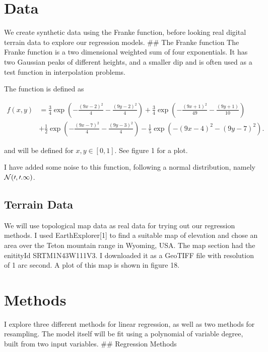 \documentclass[11pt]{article}
\begin{document}
    \hypertarget{data}{%
\section{Data}\label{data}}

We create synthetic data using the Franke function, before looking real
digital terrain data to explore our regression models. \#\# The Franke
function The Franke function is a two dimensional weighted sum of four
exponentials. It has two Gaussian peaks of different heights, and a
smaller dip and is often used as a test function in interpolation
problems.

The function is defined as

    \[
\begin{aligned*}
f(x,y) &= \frac{3}{4}\exp{\left(-\frac{(9x-2)^2}{4} - \frac{(9y-2)^2}{4}\right)}+\frac{3}{4}\exp{\left(-\frac{(9x+1)^2}{49}- \frac{(9y+1)}{10}\right)} \\
&+\frac{1}{2}\exp{\left(-\frac{(9x-7)^2}{4} - \frac{(9y-3)^2}{4}\right)} -\frac{1}{5}\exp{\left(-(9x-4)^2 - (9y-7)^2\right) }.
\end{aligned*}
\]

    and will be defined for \(x,y\in [0,1]\). See figure 1 for a plot.

I have added some noise to this function, following a normal
distribution, namely \(\cal{N}(0,0.1)\).

    \hypertarget{terrain-data}{%
\subsection{Terrain Data}\label{terrain-data}}

We will use topological map data as real data for trying out our
regression methods. I used EarthExplorer{[}1{]} to find a suitable map
of elevation and chose an area over the Teton mountain range in Wyoming,
USA. The map section had the enitityId SRTM1N43W111V3. I downloaded it
as a GeoTIFF file with resolution of 1 arc second. A plot of this map is
shown in figure 18.

    \hypertarget{methods}{%
\section{Methods}\label{methods}}

I explore three different methods for linear regression, as well as two
methods for resampling. The model itself will be fit using a polynomial
of variable degree, built from two input variables. \#\# Regression
Methods
\end{document}
